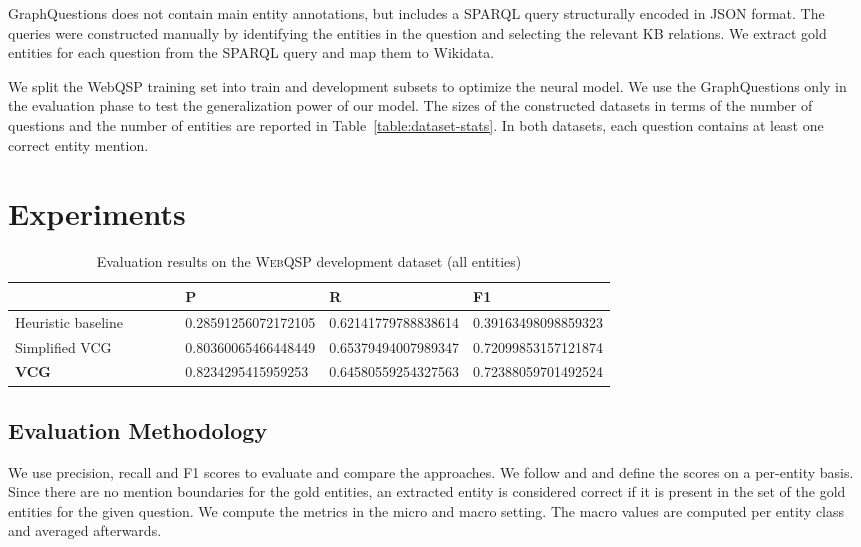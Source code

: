 \documentclass[11pt,a4paper]{article}
\begin{document}
GraphQuestions does not contain main entity annotations, but includes a SPARQL query structurally encoded in JSON format. The queries were constructed manually by identifying the entities in the question and selecting the relevant KB relations.  We extract gold entities for each question from the SPARQL query and map them to Wikidata. 

We split the WebQSP training set into train and development subsets to optimize the neural model. We use the GraphQuestions only in the evaluation phase to test the generalization power of our model. 
The sizes of the constructed datasets in terms of the number of questions and the number of entities are reported in Table~\ref{table:dataset-stats}. In both datasets, each question contains at least one correct entity mention.


\section{Experiments}

\begin{table}[t]
  \begin{center}
    \begin{tabular}{>{\raggedleft}p{0.4\linewidth}
      >{\raggedleft}p{0.1\linewidth}
      >{\raggedleft}p{0.1\linewidth}   
      >{\raggedleft\arraybackslash}p{0.1\linewidth}}
    \toprule
    & P & R & F1\\ 
    \midrule 
Heuristic baseline  &  \num{0.28591256072172105} &  \num{0.62141779788838614} &  \num{0.39163498098859323} \\
  Simplified VCG & \num{0.80360065466448449} & \num{0.65379494007989347} & \num{0.72099853157121874} \\
  \textbf{VCG}  & \num{0.8234295415959253} & \num{0.64580559254327563} & \num{0.72388059701492524} \\ 
  \bottomrule
  \end{tabular} 
  \end{center}
  \caption{Evaluation results on the \textsc{WebQSP} development dataset (all entities) \label{table:eval-webqsp-dev}}
\end{table}

\subsection{Evaluation Methodology}

We use precision, recall and F1 scores to evaluate and compare the approaches. We follow \citet{Carmel2014} and \citet{Yang2015a} and define the scores on a per-entity basis. Since there are no mention boundaries for the gold entities, an extracted entity is considered correct if it is present in the set of the gold entities for the given question. We compute the metrics in the micro and macro setting. The macro values are computed per entity class and averaged afterwards. 
\end{document}

